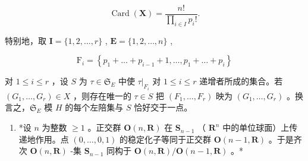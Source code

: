 \[
\operatorname{Card} (\mathbf {X}) = \frac {n !}{\prod_ {i \in I} p _ {i} !}.
\]

特别地，取 \(\mathbf{I} = \{1,2,\dots,r\}\) , \(\mathbf{E} = \{1,2,\dots,n\}\) ,

\[
\mathrm{F} _ {i} = \left\{p _ {1} + \dots + p _ {i - 1} + 1, \dots , p _ {1} + \dots + p _ {i} \right\}
\]

对 \(1 \leqslant i \leqslant r\) ，设 \(S\) 为 \(\tau \in \mathfrak{S}_{E}\) 中使 \(\tau|_{F_i}\) 对 \(1 \leqslant i \leqslant r\) 递增者所成的集合。若 \((G_1, \ldots, G_r) \in X\) ，则存在唯一的 \(\tau \in S\) 把 \((F_1, \ldots, F_r)\) 映为 \((G_1, \ldots, G_r)\) 。换言之，\(\mathfrak{S}_{E}\) 模 \(H\) 的每个左陪集与 \(S\) 恰好交于一点。

\begin{enumerate}
\def\labelenumi{(\arabic{enumi})}
\setcounter{enumi}{2}
\tightlist
\item
  *设 \(n\) 为整数 \(\geqslant 1\) 。正交群 \(\mathbf{O}(n, \mathbf{R})\) 在 \(\mathbf{S}_{n-1}\) （ \(\mathbf{R}^n\) 中的单位球面）上传递地作用。点 \((0, \ldots, 0, 1)\) 的稳定化子等同于正交群 \(\mathbf{O}(n-1, \mathbf{R})\) 。于是齐次 \(\mathbf{O}(n, \mathbf{R})\) -集 \(\mathbf{S}_{n-1}\) 同构于 \(\mathbf{O}(n, \mathbf{R}) / \mathbf{O}(n-1, \mathbf{R})\) 。*
\end{enumerate}

